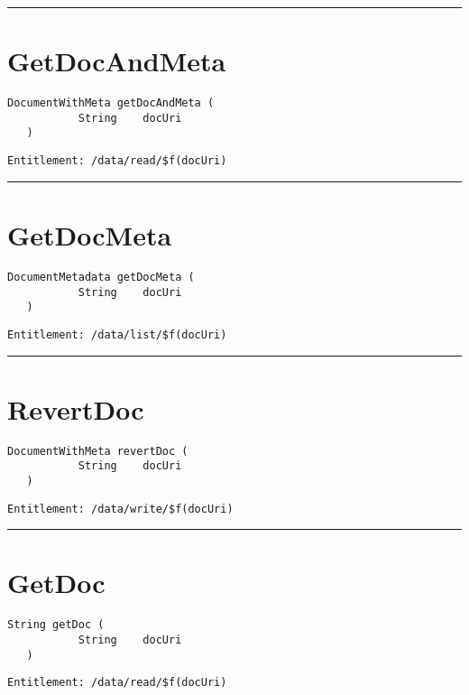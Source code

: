 \rule{12cm}{2pt}
\section{GetDocAndMeta}
\label{Api:GetDocAndMeta}
\begin{lstlisting}[style=nonumbers]
   DocumentWithMeta getDocAndMeta (
           String    docUri
   )
\end{lstlisting}
\begin{Verbatim}[formatcom=\color{Maroon}]
  Entitlement: /data/read/$f(docUri)
\end{Verbatim}



\rule{12cm}{2pt}
\section{GetDocMeta}
\label{Api:GetDocMeta}
\begin{lstlisting}[style=nonumbers]
   DocumentMetadata getDocMeta (
           String    docUri
   )
\end{lstlisting}
\begin{Verbatim}[formatcom=\color{Maroon}]
  Entitlement: /data/list/$f(docUri)
\end{Verbatim}



\rule{12cm}{2pt}
\section{RevertDoc}
\label{Api:RevertDoc}
\begin{lstlisting}[style=nonumbers]
   DocumentWithMeta revertDoc (
           String    docUri
   )
\end{lstlisting}
\begin{Verbatim}[formatcom=\color{Maroon}]
  Entitlement: /data/write/$f(docUri)
\end{Verbatim}



\rule{12cm}{2pt}
\section{GetDoc}
\label{Api:GetDoc}
\begin{lstlisting}[style=nonumbers]
   String getDoc (
           String    docUri
   )
\end{lstlisting}
\begin{Verbatim}[formatcom=\color{Maroon}]
  Entitlement: /data/read/$f(docUri)
\end{Verbatim}



